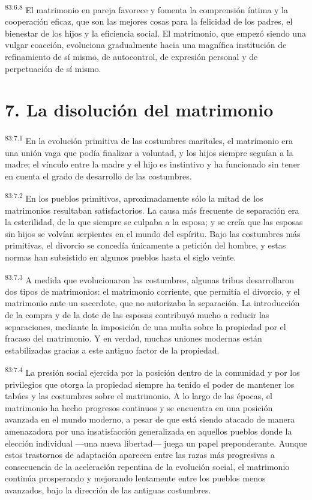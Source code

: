 \documentclass[twoside, 11pt]{book}
\begin{document}
\par
\textsuperscript{83:6.8} El matrimonio en pareja favorece y fomenta la comprensión íntima y la cooperación eficaz, que son las mejores cosas para la felicidad de los padres, el bienestar de los hijos y la eficiencia social. El matrimonio, que empezó siendo una vulgar coacción, evoluciona gradualmente hacia una magnífica institución de refinamiento de sí mismo, de autocontrol, de expresión personal y de perpetuación de sí mismo.

\section*{7. La disolución del matrimonio}
\par
\textsuperscript{83:7.1} En la evolución primitiva de las costumbres maritales, el matrimonio era una unión vaga que podía finalizar a voluntad, y los hijos siempre seguían a la madre; el vínculo entre la madre y el hijo es instintivo y ha funcionado sin tener en cuenta el grado de desarrollo de las costumbres.

\par
\textsuperscript{83:7.2} En los pueblos primitivos, aproximadamente sólo la mitad de los matrimonios resultaban satisfactorios. La causa más frecuente de separación era la esterilidad, de la que siempre se culpaba a la esposa; y se creía que las esposas sin hijos se volvían serpientes en el mundo del espíritu. Bajo las costumbres más primitivas, el divorcio se concedía únicamente a petición del hombre, y estas normas han subsistido en algunos pueblos hasta el siglo veinte.

\par
\textsuperscript{83:7.3} A medida que evolucionaron las costumbres, algunas tribus desarrollaron dos tipos de matrimonios: el matrimonio corriente, que permitía el divorcio, y el matrimonio ante un sacerdote, que no autorizaba la separación. La introducción de la compra y de la dote de las esposas contribuyó mucho a reducir las separaciones, mediante la imposición de una multa sobre la propiedad por el fracaso del matrimonio. Y en verdad, muchas uniones modernas están estabilizadas gracias a este antiguo factor de la propiedad.

\par
\textsuperscript{83:7.4} La presión social ejercida por la posición dentro de la comunidad y por los privilegios que otorga la propiedad siempre ha tenido el poder de mantener los tabúes y las costumbres sobre el matrimonio. A lo largo de las épocas, el matrimonio ha hecho progresos continuos y se encuentra en una posición avanzada en el mundo moderno, a pesar de que está siendo atacado de manera amenazadora por una insatisfacción generalizada en aquellos pueblos donde la elección individual ---una nueva libertad--- juega un papel preponderante. Aunque estos trastornos de adaptación aparecen entre las razas más progresivas a consecuencia de la aceleración repentina de la evolución social, el matrimonio continúa prosperando y mejorando lentamente entre los pueblos menos avanzados, bajo la dirección de las antiguas costumbres.
\end{document}
